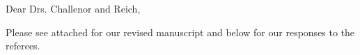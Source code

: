 \documentclass[10pt]{article}
\begin{document}
Dear Drs. Challenor and Reich,

Please see attached for our revised manuscript and below for our responses to the referees. 
\end{document}
